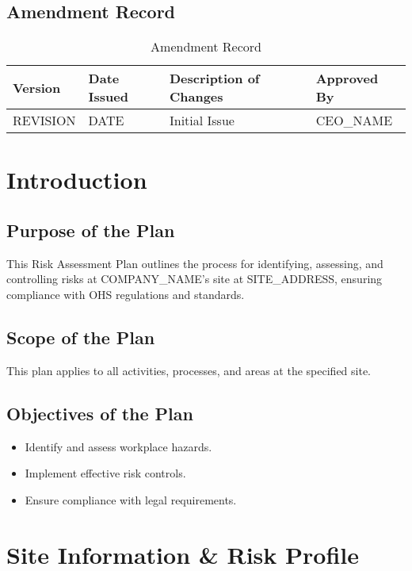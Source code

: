 \documentclass[12pt]{article}
\begin{document}
\subsection{Amendment Record}
\begin{table}[h]
    \centering
    \begin{tabular}{p{2cm}p{3cm}p{6cm}p{3cm}}
        \toprule
        \textbf{Version} & \textbf{Date Issued} & \textbf{Description of Changes} & \textbf{Approved By} \\
        \midrule
        {{REVISION}} & {{DATE}} & Initial Issue & {{CEO_NAME}} \\
        \bottomrule
    \end{tabular}
    \caption{Amendment Record}
\end{table}

\section{Introduction}

\subsection{Purpose of the Plan}
This Risk Assessment Plan outlines the process for identifying, assessing, and controlling risks at {{COMPANY_NAME}}'s site at {{SITE_ADDRESS}}, ensuring compliance with OHS regulations and standards.

\subsection{Scope of the Plan}
This plan applies to all activities, processes, and areas at the specified site.

\subsection{Objectives of the Plan}
\begin{itemize}
    \item Identify and assess workplace hazards.
    \item Implement effective risk controls.
    \item Ensure compliance with legal requirements.
\end{itemize}

\section{Site Information \& Risk Profile}
\end{document}
